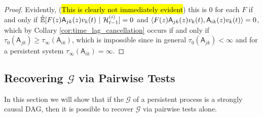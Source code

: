 \documentclass[12pt]{article}
\def\gcg{\mathcal{G}}  %
\def\A{\mathsf{A}}  %
\def\H{\mathcal{H}}  %
\newcommand{\linE}[2]{\hat{\E}[#1\ |\ #2]}  %
\begin{document}
\begin{proof}
  Evidently, (\hl{This is clearly not immediately evident}) this is
  $0$ for each $F$ if and only if
  $\linE{F(z)\A_{jk}(z)v_k(t)}{\H_{t - 1}^{(i)}} = 0$ and
  $\inner{F(z)\A_{jk}(z)v_k(t)}{\A_{ik}(z)v_k(t)} = 0$, which by
  Collary \ref{cor:time_lag_cancellation} occurs if and only if
  $\tau_0(\A_{jk}) \ge \tau_\infty(\A_{ik})$, which is impossible
  since in general $\tau_0(\A_{jk}) < \infty$ and for a persistent system
  $\tau_\infty(\A_{ik}) = \infty$.
\end{proof}

\subsection{Recovering $\gcg$ via Pairwise Tests}
\label{sec:pairwise_algorithm}
In this section we will show that if the $\gcg$ of a persistent
process is a strongly causal DAG, then it is possible to recover
$\gcg$ via pairwise tests alone.

\end{document}
